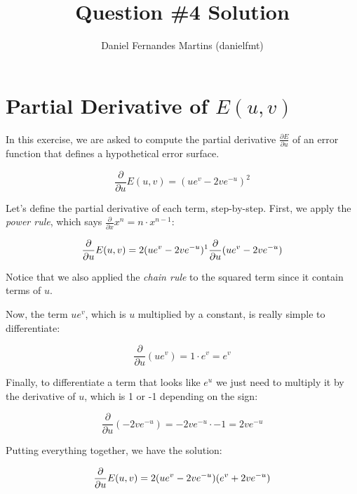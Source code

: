 \documentclass{article}
\author{Daniel Fernandes Martins (danielfmt)}
\title{Question \#4 Solution}
\begin{document}
\maketitle

\section{Partial Derivative of $E(u,v)$}

In this exercise, we are asked to compute the partial derivative
$\frac{\partial E}{\partial u}$ of an error function that defines a
hypothetical error surface.

\begin{equation*}
\frac{\partial}{\partial u} E(u,v) = (ue^v -2ve^{-u})^2
\end{equation*}

Let's define the partial derivative of each term, step-by-step. First, we apply
the \textit{power rule}, which says $\frac{\partial}{\partial x} x^n = n \cdot x^{n-1}$:

\begin{equation*}
\frac{\partial}{\partial u} E(u,v) = 2(ue^v -2ve^{-u})^1 \\ 
\frac{\partial}{\partial u} (ue^v -2ve^{-u})
\end{equation*}

Notice that we also applied the \textit{chain rule} to the squared term since
it contain terms of $u$.

Now, the term $ue^v$, which is $u$ multiplied by a constant, is really simple
to differentiate:

\begin{equation*}
\frac{\partial}{\partial u} (ue^v) = 1 \cdot e^v = e^v
\end{equation*}

Finally, to differentiate a term that looks like $e^u$ we just need to multiply
it by the derivative of $u$, which is 1 or -1 depending on the sign:

\begin{equation*}
\frac{\partial}{\partial u} (-2ve^{-u}) = -2ve^{-u} \cdot -1 = 2ve^{-u}
\end{equation*}

Putting everything together, we have the solution:

\begin{equation*}
\frac{\partial}{\partial u} E(u, v) = \\
2(ue^v -2ve^{-u})(e^v + 2ve^{-u})
\end{equation*}
\end{document}
